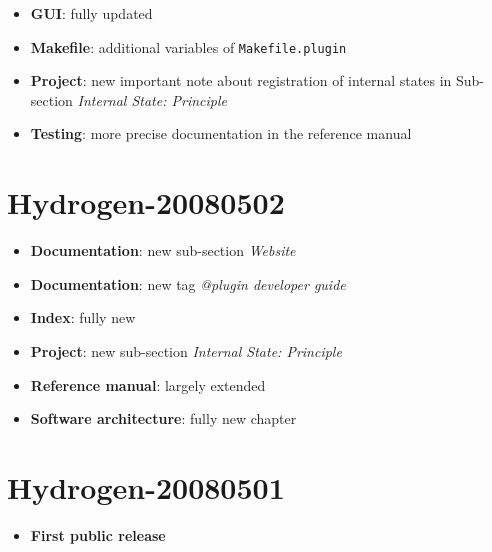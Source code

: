 \begin{itemize}
\item \textbf{GUI}: fully updated
\item \textbf{Makefile}: additional variables of \texttt{Makefile.plugin}
\item \textbf{Project}: new important note about registration of internal
  states in Sub-section \emph{Internal State: Principle}
\item \textbf{Testing}: more precise documentation in the reference manual
\end{itemize}

\section*{Hydrogen-20080502}

\begin{itemize}
\item \textbf{Documentation}: new sub-section \emph{Website}
\item \textbf{Documentation}: new \ocamldoc tag \emph{@plugin developer guide}
\item \textbf{Index}: fully new
\item \textbf{Project}: new sub-section \emph{Internal State: Principle}
\item \textbf{Reference manual}: largely extended
\item \textbf{Software architecture}: fully new chapter
\end{itemize}

\section*{Hydrogen-20080501}

\begin{itemize}
\item \textbf{First public release}
\end{itemize}

